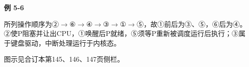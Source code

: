 {\color{ink}\bfseries 例 5-6}\par\vspace{1bp}所列操作顺序为{\symfont ②}\(\to \){\symfont ⑥}\(\to \){\symfont ④}\(\to \){\symfont ③}\(\to \){\symfont ①}\(\to \){\symfont ⑤}，故{\symfont ①}前后为{\symfont ③}、{\symfont ⑤}，{\symfont ⑥}后为{\symfont ④}。{\symfont ②}使P阻塞并让出CPU，{\symfont ①}唤醒后P就绪，{\symfont ⑤}须等P重新被调度运行后执行；{\symfont ③}属于键盘驱动，中断处理运行于内核态。\par {\color{ink}图示见合订本第145、146、147页侧栏。}
